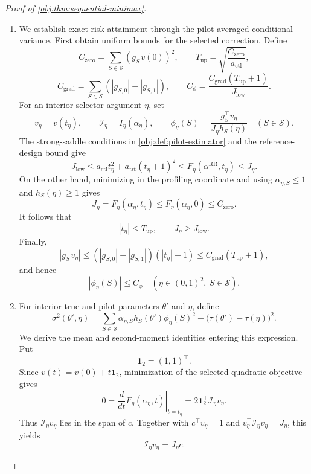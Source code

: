 \documentclass[11pt]{article}
\begin{document}
\begin{proof}[Proof of \cref{obj:thm:sequential-minimax}]
\begin{enumerate}
\item
We establish exact risk attainment through the pilot-averaged conditional variance. First obtain uniform bounds for the selected correction. Define
\[
C_{\mathrm{zero}}
=
\sum_{S\in\mathcal S}(g_S^\top v(0))^2,
\qquad
T_{\mathrm{up}}
=
\sqrt{\frac{C_{\mathrm{zero}}}{a_{\mathrm{ctl}}}},
\]
\[
C_{\mathrm{grad}}
=
\sum_{S\in\mathcal S}(|g_{S,0}|+|g_{S,1}|),
\qquad
C_\phi
=
\frac{C_{\mathrm{grad}}(T_{\mathrm{up}}+1)}
{J_{\mathrm{low}}}.
\]
For an interior selector argument \(\eta\), set
\[
v_\eta=v(t_\eta),
\qquad
\mathcal I_\eta=I_\eta(\alpha_\eta),
\qquad
\phi_\eta(S)=
\frac{g_S^\top v_\eta}{J_\eta h_S(\eta)}
\quad(S\in\mathcal S).
\]
The strong-saddle conditions in \cref{obj:def:pilot-estimator} and the reference-design bound give
\[
J_{\mathrm{low}}
\le
a_{\mathrm{ctl}}t_\eta^2+a_{\mathrm{trt}}(t_\eta+1)^2
\le
F_\eta(\alpha^{\mathrm{RR}},t_\eta)
\le
J_\eta.
\]
On the other hand, minimizing in the profiling coordinate and using
\(\alpha_{\eta,S}\le1\) and \(h_S(\eta)\ge1\) gives
\[
J_\eta
=
F_\eta(\alpha_\eta,t_\eta)
\le F_\eta(\alpha_\eta,0)
\le C_{\mathrm{zero}}.
\]
It follows that
\[
|t_\eta|\le T_{\mathrm{up}},
\qquad
J_\eta\ge J_{\mathrm{low}}.
\]
Finally,
\[
|g_S^\top v_\eta|
\le
(|g_{S,0}|+|g_{S,1}|)(|t_\eta|+1)
\le
C_{\mathrm{grad}}(T_{\mathrm{up}}+1),
\]
and hence
\[
|\phi_\eta(S)|\le C_\phi
\quad(\eta\in(0,1)^2,\ S\in\mathcal S).
\]

\item
For interior true and pilot parameters \(\theta'\) and \(\eta\), define
\[
\sigma^2(\theta',\eta)
=
\sum_{S\in\mathcal S}
\alpha_{\eta,S}h_S(\theta')\phi_\eta(S)^2
-
\bigl(\tau(\theta')-\tau(\eta)\bigr)^2.
\]
We derive the mean and second-moment identities entering this expression. Put
\[
\mathbf{1}_2=(1,1)^\top.
\]
Since \(v(t)=v(0)+t\mathbf{1}_2\), minimization of the selected quadratic objective gives
\[
0=
\left.\frac{d}{dt}F_\eta(\alpha_\eta,t)\right|_{t=t_\eta}
=
2\mathbf{1}_2^\top\mathcal I_\eta v_\eta.
\]
Thus \(\mathcal I_\eta v_\eta\) lies in the span of \(c\). Together with
\(c^\top v_\eta=1\) and \(v_\eta^\top\mathcal I_\eta v_\eta=J_\eta\), this yields
\[
\mathcal I_\eta v_\eta=J_\eta c.
\]


\end{enumerate}
\end{proof}
\end{document}
